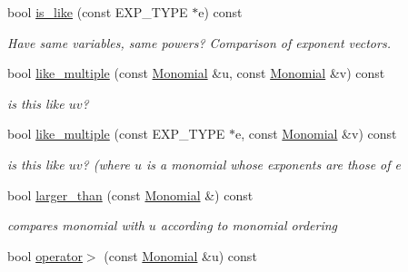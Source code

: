 \begin{Indent}
\begin{DoxyCompactItemize}
\mbox{\label{group__polygroup_ac68d2650242d00ab6c26c3f01f31414a}} 
bool \hyperlink{group__polygroup_ac68d2650242d00ab6c26c3f01f31414a}{is\+\_\+like} (const E\+X\+P\+\_\+\+T\+Y\+PE $\ast$e) const
\begin{DoxyCompactList}\small\item\em Have same variables, same powers? Comparison of exponent vectors. \end{DoxyCompactList}\item 
\mbox{\label{group__polygroup_adec4a37e9e36f821ae69ca00eb087961}} 
bool \hyperlink{group__polygroup_adec4a37e9e36f821ae69ca00eb087961}{like\+\_\+multiple} (const \hyperlink{group__polygroup_class_monomial}{Monomial} \&u, const \hyperlink{group__polygroup_class_monomial}{Monomial} \&v) const
\begin{DoxyCompactList}\small\item\em is {\ttfamily this} like $uv$? \end{DoxyCompactList}\item 
\mbox{\label{group__polygroup_a1b3b3fe2d07b206d5c6cb5f7298754a2}} 
bool \hyperlink{group__polygroup_a1b3b3fe2d07b206d5c6cb5f7298754a2}{like\+\_\+multiple} (const E\+X\+P\+\_\+\+T\+Y\+PE $\ast$e, const \hyperlink{group__polygroup_class_monomial}{Monomial} \&v) const
\begin{DoxyCompactList}\small\item\em is {\ttfamily this} like $uv$? (where $u$ is a monomial whose exponents are those of {\ttfamily e} \end{DoxyCompactList}\item 
\mbox{\label{group__polygroup_ab50a4f90c210bcaf6e21fc16028a121a}} 
bool \hyperlink{group__polygroup_ab50a4f90c210bcaf6e21fc16028a121a}{larger\+\_\+than} (const \hyperlink{group__polygroup_class_monomial}{Monomial} \&) const
\begin{DoxyCompactList}\small\item\em compares monomial with $u$ according to monomial ordering \end{DoxyCompactList}\item 
\mbox{\label{group__polygroup_ad660e085a10e15ba0e13bcd9790994d0}} 
bool \hyperlink{group__polygroup_ad660e085a10e15ba0e13bcd9790994d0}{operator$>$} (const \hyperlink{group__polygroup_class_monomial}{Monomial} \&u) const

\end{DoxyCompactItemize}
\end{Indent}
